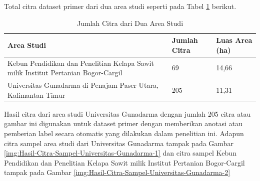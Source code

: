 Total citra dataset primer dari dua area studi seperti pada Tabel \ref{tbl:Jumlah-Citra-Dari-Dua-Area-Studi} berikut.

\begin{singlespace}
	\begin{table}[H]
		\centering
		\caption{Jumlah Citra dari Dua Area Studi}
		\label{tbl:Jumlah-Citra-Dari-Dua-Area-Studi}
		\begin{tabular}{|p{4cm}|p{4cm}|p{4cm}|}
			\hline
			\rowcolor[HTML]{D9D9D9} 
			Area Studi                                                                         & Jumlah Citra & Luas Area (ha) \\ \hline
			Kebun Pendidikan dan Penelitian Kelapa Sawit milik Institut Pertanian Bogor-Cargil & 69           & 14,66          \\ \hline
			Universitas Gunadarma di Penajam Paser Utara, Kalimantan Timur                     & 205          & 11,31          \\ \hline
		\end{tabular}
	\end{table}
\end{singlespace}

Hasil citra dari area studi Universitas Gunadarma dengan jumlah 205 citra atau gambar ini digunakan untuk dataset primer dengan memberikan anotasi atau pemberian label secara otomatis yang dilakukan dalam penelitian ini.  Adapun citra sampel area studi dari Universitas Gunadarma tampak pada Gambar \ref{img:Hasil-Citra-Sampel-Universitas-Gunadarma-1} dan citra sampel Kebun Pendidikan dan Penelitian Kelapa Sawit milik Institut Pertanian Bogor-Cargil tampak pada Gambar \ref{img:Hasil-Citra-Sampel-Universitas-Gunadarma-2}

